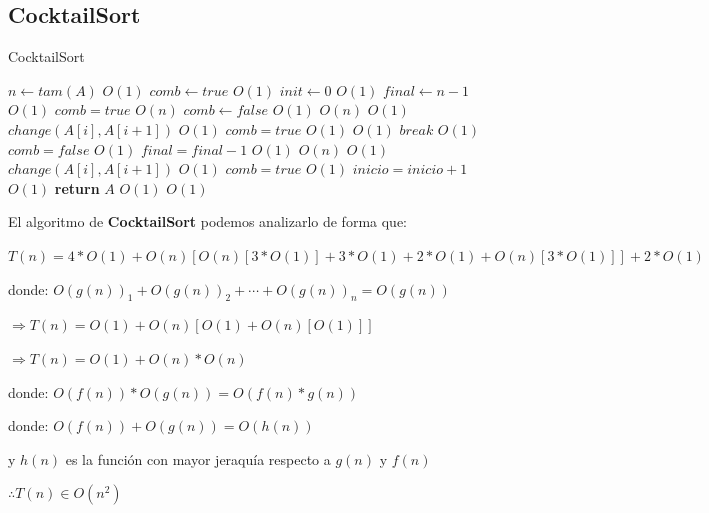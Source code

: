 \documentclass[12pt,twoside]{article}
\begin{document}
\subsection{\textbf{CocktailSort}}
\begin{algorithm}
  \caption{CocktailSort}\label{euclid}
  \begin{algorithmic}[1]
    \State $n \gets tam(A)$                     \Comment $O(1)$
    \State $comb \gets true$                    \Comment $O(1)$
    \State $init \gets 0$                       \Comment $O(1)$
    \State $final \gets n - 1$                  \Comment $O(1)$
    \While $comb = true$                        \Comment $O(n)$
      \State $comb \gets false$                 \Comment $O(1)$
          \Comment $O(n)$
                         \Comment $O(1)$
          \State $change(A[i], A[i + 1])$       \Comment $O(1)$
          \State $comb = true$                  \Comment $O(1)$
        \EndIf
      \EndFor
                             \Comment $O(1)$
        \State $break$                          \Comment $O(1)$
      \EndIf
      \State $comb = false$                     \Comment $O(1)$
      \State $final = final - 1$                \Comment $O(1)$
          \Comment $O(n)$
                         \Comment $O(1)$
          \State $change(A[i], A[i + 1])$       \Comment $O(1)$
          \State $comb = true$                  \Comment $O(1)$
        \EndIf
      \EndFor
      \State $inicio = inicio + 1$              \Comment $O(1)$
    \EndWhile
    \State \textbf{return} $A$ \Comment $O(1)$  \Comment $O(1)$
  \EndFunction
  \end{algorithmic}
\end{algorithm}
El algoritmo de \textbf{CocktailSort} podemos analizarlo de forma que:

\centerline{$T(n) = 4*O(1)+O(n)[O(n)[3*O(1)]+ 3*O(1)+2*O(1)+O(n)[3*O(1)]] + 2*O(1)$}
\centerline{}
\centerline{donde: $O(g(n))_{1} + O(g(n))_{2}+\cdots+O(g(n))_n = O(g(n))$}
\centerline{}
\centerline{$\Rightarrow T(n) = O(1)+O(n)[O(1) + O(n)[O(1)]]$}
\centerline{}
\centerline{$\Rightarrow T(n) = O(1) + O(n)*O(n)$}
\centerline{}
\centerline{donde: $O(f(n)) * O(g(n))= O(f(n)*g(n))$}
\centerline{}
\centerline{donde: $O(f(n)) + O(g(n)) = O(h(n))$}
\centerline{y $h(n)$ es la funci\'on con mayor jeraqu\'ia respecto a $g(n)$ y $f(n)$}
\centerline{}
\centerline{$\therefore T(n) \in O(n^2)$}
\end{document}
